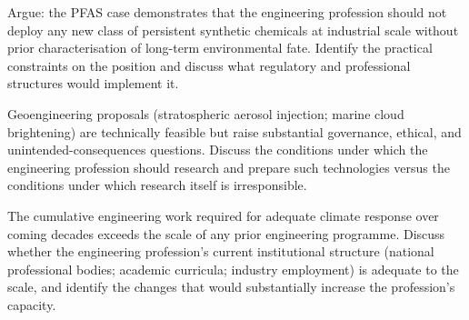 \begin{exercise}
Argue: the PFAS case demonstrates that the engineering profession should not deploy any new class of persistent synthetic chemicals at industrial scale without prior characterisation of long-term environmental fate. Identify the practical constraints on the position and discuss what regulatory and professional structures would implement it.
\end{exercise}

\begin{exercise}
Geoengineering proposals (stratospheric aerosol injection; marine cloud brightening) are technically feasible but raise substantial governance, ethical, and unintended-consequences questions. Discuss the conditions under which the engineering profession should research and prepare such technologies versus the conditions under which research itself is irresponsible.
\end{exercise}

\begin{exercise}
The cumulative engineering work required for adequate climate response over coming decades exceeds the scale of any prior engineering programme. Discuss whether the engineering profession's current institutional structure (national professional bodies; academic curricula; industry employment) is adequate to the scale, and identify the changes that would substantially increase the profession's capacity.
\end{exercise}
